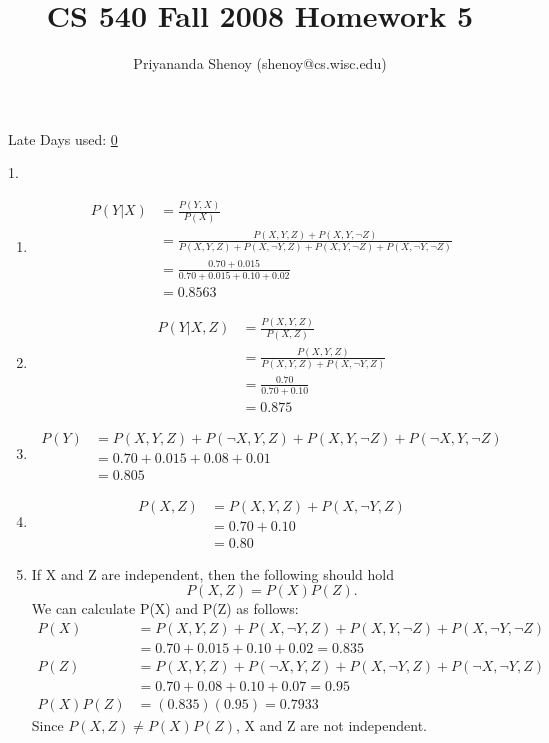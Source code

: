 \documentclass[11pt]{article}
\author{Priyananda Shenoy (shenoy@cs.wisc.edu)}
\title{	CS 540 Fall 2008 Homework 5}
\begin{document}
\maketitle
\begin{center}
	Late Days used: \underline{0}
\end{center}

\newpage

\renewcommand{\labelenumi}{[\alph{enumi}]}

1.
\begin{enumerate}
	\item
	\begin{align*}
		P(Y|X) &= \frac{P(Y,X)}{P(X)} \\
			&= \frac{P(X,Y,Z) + P(X,Y,\lnot Z)}{P(X,Y,Z) + P(X,\lnot Y,Z) + P(X,Y, \lnot Z) + P(X,\lnot Y, \lnot Z)} \\
			&= \frac{0.70 + 0.015}{0.70 + 0.015 + 0.10 + 0.02} \\
			&= \mathbf{0.8563}
	\end{align*}
	
	\item
	\begin{align*}
		P(Y|X,Z) &= \frac{P(X,Y,Z)}{P(X,Z)} \\
			&= \frac{P(X,Y,Z)}{P(X,Y,Z) + P(X,\lnot Y,Z)} \\
			&= \frac{0.70}{0.70 + 0.10} \\
			&= \mathbf{0.875}
	\end{align*}
	
	\item
	\begin{align*}
		P(Y) &= P(X,Y,Z) + P(\lnot X,Y,Z) + P(X,Y,\lnot Z) + P(\lnot X, Y, \lnot Z) \\
			&= 0.70 + 0.015 + 0.08 + 0.01 \\
			&= \mathbf{0.805}
	\end{align*}
	
	\item
	\begin{align*}
		P(X,Z) &= P(X,Y,Z) + P(X,\lnot Y,Z) \\
			&= 0.70 + 0.10 \\
			&= \mathbf{0.80}
	\end{align*}
	
	\item If X and Z are independent, then the following should hold
	\[ P(X,Z) = P(X)P(Z). \]
	We can calculate P(X) and P(Z) as follows:
	\begin{align*}
		P(X) &= P(X,Y,Z) + P(X,\lnot Y,Z) + P(X,Y,\lnot Z) + P(X,\lnot Y,\lnot Z) \\
				 &= 0.70 + 0.015 + 0.10 + 0.02 = \mathbf{0.835} \\
		P(Z) &= P(X,Y,Z) + P(\lnot X,Y,Z) + P(X,\lnot Y,Z) + P(\lnot X,\lnot Y,Z) \\
				 &= 0.70 + 0.08 + 0.10 + 0.07  = \mathbf{0.95}\\
		P(X)P(Z) &= (0.835)(0.95) = \mathbf{0.7933}
	\end{align*}
	Since $P(X,Z) \neq P(X)P(Z)$, X and Z are not independent.
\end{enumerate}
\end{document}
